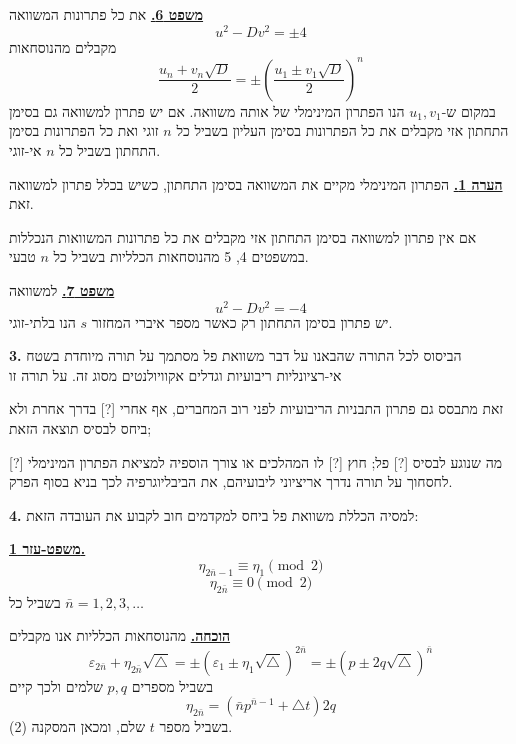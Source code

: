 \bigskip
\noindent\textbf{\underline{משפט 6.}}
את כל פתרונות המשוואה
\[ u^2 - Dv^2 = \pm 4 \]
מקבלים מהנוסחאות
\[ \frac{u_n + v_n\sqrt{D}}{2} = \pm\left(\frac{u_1 \pm v_1\sqrt{D}}{2}\right)^n \]
במקום ש-$u_1, v_1$ הנו הפתרון המינימלי של אותה משוואה. אם יש פתרון למשוואה גם בסימן התחתון אזי מקבלים את כל הפתרונות בסימן העליון בשביל כל $n$ זוגי ואת כל הפתרונות בסימן התחתון בשביל כל $n$ אי-זוגי.

\bigskip
\noindent\textbf{\underline{הערה 1.}}
הפתרון המינימלי מקיים את המשוואה בסימן התחתון, כשיש בכלל פתרון למשוואה זאת.

אם אין פתרון למשוואה בסימן התחתון אזי מקבלים את כל פתרונות המשוואות הנכללות במשפטים 4, 5 מהנוסחאות הכלליות בשביל כל $n$ טבעי.

\bigskip
\noindent\textbf{\underline{משפט 7.}}
למשוואה
\[ u^2 - Dv^2 = -4 \]
יש פתרון בסימן התחתון רק כאשר מספר איברי המחזור $s$ הנו בלתי-זוגי.

\medskip
\noindent\textbf{3.} הביסוס לכל התורה שהבאנו על דבר משוואת פל מסתמך על תורה מיוחדת בשטח אי-רציונליות ריבועיות וגדלים אקוויולנטים מסוג זה. על תורה זו

זאת מתבסס גם פתרון התבניות הריבועיות לפני רוב המחברים, אף אחרי [?] בדרך אחרת ולא ביחס לבסיס תוצאה הזאת;

מה שנוגע לבסיס [?] פל; חוץ [?] לו המהלכים או צורך הוספיה למציאת הפתרון המינימלי [?] לחסחוך על תורה נדרך אריציוני ליבועיהם, את הביבליוגרפיה לכך בניא בסוף הפרק.

\medskip
\noindent\textbf{4.} למסיה הכללת משוואת פל ביחס למקדמים חוב לקבוע את העובדה הזאת:

\bigskip
\noindent\textbf{\underline{משפט-עזר 1.}}
\[ \eta_{2\bar{n}-1} \equiv \eta_1 \pmod{2} \tag{1} \]
\[ \eta_{2\bar{n}} \equiv 0 \pmod{2} \tag{2} \]
בשביל כל $\bar{n} = 1, 2, 3, \ldots$

\bigskip
\noindent\textbf{\underline{הוכחה.}}
מהנוסחאות הכלליות אנו מקבלים
\[ \varepsilon_{2\bar{n}} + \eta_{2\bar{n}}\sqrt{\triangle} = \pm(\varepsilon_1 \pm \eta_1\sqrt{\triangle})^{2\bar{n}} = \pm(p \pm 2q\sqrt{\triangle})^{\bar{n}} \]
בשביל מספרים $p, q$ שלמים ולכך קיים
\[ \eta_{2\bar{n}} = (\bar{n}p^{\bar{n}-1} + \triangle t) 2q \tag{3} \]
בשביל מספר $t$ שלם, ומכאן המסקנה (2).


